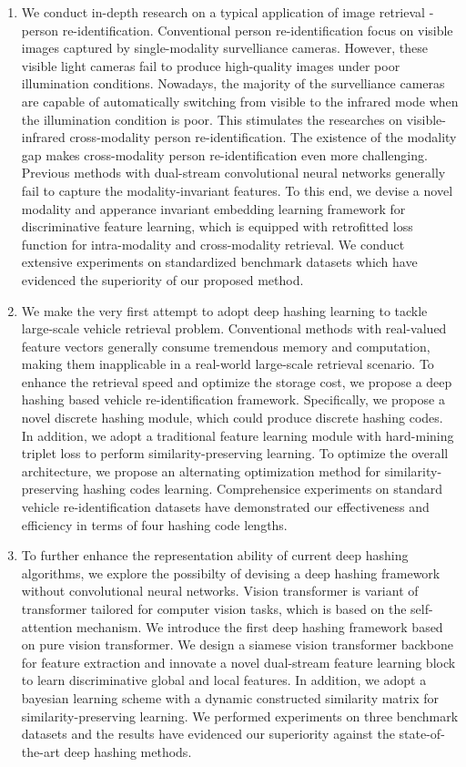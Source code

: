 \begin{abstract*}
\begin{enumerate}
  \item We conduct in-depth research on a typical application of image retrieval - person re-identification. Conventional person re-identification focus on visible images captured by single-modality survelliance cameras. However, these visible light cameras fail to produce high-quality images under poor illumination conditions. Nowadays, the majority of the survelliance cameras are capable of automatically switching from visible to the infrared mode when the illumination condition is poor. This stimulates the researches on visible-infrared cross-modality person re-identification. The existence of the modality gap makes cross-modality person re-identification even more challenging. Previous methods with dual-stream convolutional neural networks generally fail to capture the modality-invariant features. To this end, we devise a novel modality and apperance invariant embedding learning framework for discriminative feature learning, which is equipped with retrofitted loss function for intra-modality and cross-modality retrieval. We conduct extensive experiments on standardized benchmark datasets which have evidenced the superiority of our proposed method.
  \item We make the very first attempt to adopt deep hashing learning to tackle large-scale vehicle retrieval problem. Conventional methods with real-valued feature vectors generally consume tremendous memory and computation, making them inapplicable in a real-world large-scale retrieval scenario. To enhance the retrieval speed and optimize the storage cost, we propose a deep hashing based vehicle re-identification framework.  Specifically, we propose a novel discrete hashing module, which could produce discrete hashing codes. In addition, we adopt a traditional feature learning module with hard-mining triplet loss to perform similarity-preserving learning. To optimize the overall architecture, we propose an alternating optimization method for similarity-preserving hashing codes learning.  Comprehensice experiments on standard vehicle re-identification datasets have demonstrated our effectiveness and efficiency in terms of four hashing code lengths.
  \item To further enhance the representation ability of current deep hashing algorithms, we explore the possibilty of devising a deep hashing framework without convolutional neural networks. Vision transformer is variant of transformer tailored for computer vision tasks, which is based on the self-attention mechanism. We introduce the first deep hashing framework based on pure vision transformer. We design a siamese vision transformer backbone for feature extraction and innovate a novel dual-stream feature learning block to learn discriminative global and local features. In addition, we adopt a bayesian learning scheme with a dynamic constructed similarity matrix for similarity-preserving learning. We performed experiments on three benchmark datasets and the results have evidenced our superiority against the state-of-the-art deep hashing methods.

\end{enumerate}
\end{abstract*}
